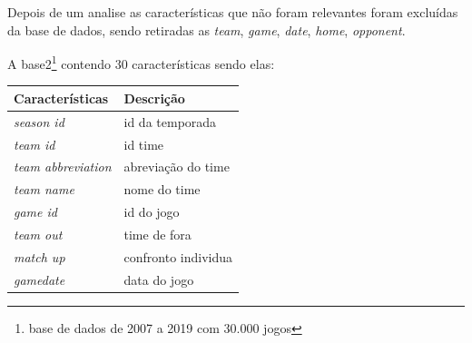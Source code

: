 Depois de um analise as características que não foram relevantes foram excluídas da base de dados, sendo retiradas as \textit{team}, \textit{game}, \textit{date}, \textit{home}, \textit{opponent}.

A base2\footnote{base de dados de 2007 a 2019 com 30.000 jogos} contendo 30 características sendo elas:

\begin{table}[htbp]
	\begin{longtable}{|l|l|}
		\hline
		Características                        & Descrição                                                                                                                                         \\ \hline
		\textit{season id}                     & id da temporada                                                                                                                                   \\ \hline
		\textit{team id}                       & id time                                                                                                                                           \\ \hline
		\textit{team abbreviation}             & abreviação do time                                                                                                                                \\ \hline
		\textit{team name}                     & nome do time                                                                                                                                      \\ \hline
		\textit{game id}                       & id do jogo                                                                                                                                        \\ \hline
		\textit{team out}                      & time de fora                                                                                                                                      \\ \hline
		\textit{match up}                      & confronto individua                                                                                                                               \\ \hline
		\textit{gamedate}                      & data do jogo                                                                                                                                      \\ \hline

\end{longtable}
\end{table}

